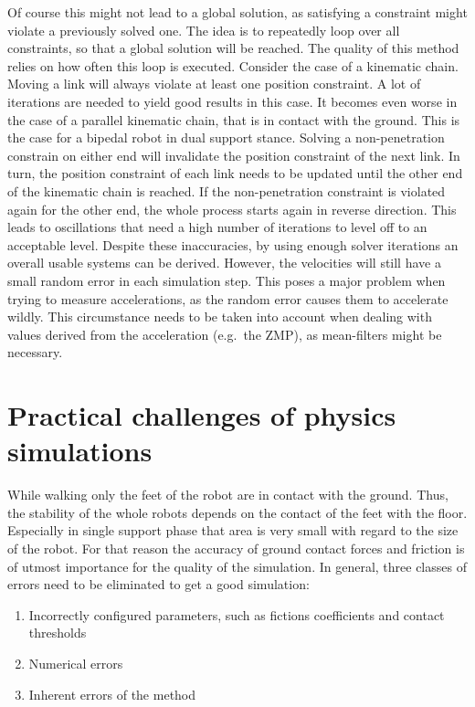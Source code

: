 \documentclass[english,ngerman]{KITreprt}
\begin{document}
Of course this might not lead to a global solution, as satisfying a
constraint might violate a previously solved one. The idea is to
repeatedly loop over all constraints, so that a global solution will be
reached. The quality of this method relies on how often this loop is
executed. Consider the case of a kinematic chain. Moving a link will
always violate at least one position constraint. A lot of iterations are
needed to yield good results in this case. It becomes even worse in the
case of a parallel kinematic chain, that is in contact with the ground.
This is the case for a bipedal robot in dual support stance. Solving a
non-penetration constrain on either end will invalidate the position
constraint of the next link. In turn, the position constraint of each
link needs to be updated until the other end of the kinematic chain is
reached. If the non-penetration constraint is violated again for the
other end, the whole process starts again in reverse direction. This
leads to oscillations that need a high number of iterations to level off
to an acceptable level. Despite these inaccuracies, by using enough
solver iterations an overall usable systems can be derived. However, the
velocities will still have a small random error in each simulation step.
This poses a major problem when trying to measure accelerations, as the
random error causes them to accelerate wildly. This circumstance needs
to be taken into account when dealing with values derived from the
acceleration (e.g.~the ZMP), as mean-filters might be necessary.

\section{Practical challenges of physics
simulations}\label{practical-challenges-of-physics-simulations}

While walking only the feet of the robot are in contact with the ground.
Thus, the stability of the whole robots depends on the contact of the
feet with the floor. Especially in single support phase that area is
very small with regard to the size of the robot. For that reason the
accuracy of ground contact forces and friction is of utmost importance
for the quality of the simulation. In general, three classes of errors
need to be eliminated to get a good simulation:

\begin{enumerate}
\def\labelenumi{\arabic{enumi}.}
\item
  Incorrectly configured parameters, such as fictions coefficients and
  contact thresholds
\item
  Numerical errors
\item
  Inherent errors of the method
\end{enumerate}
\end{document}
